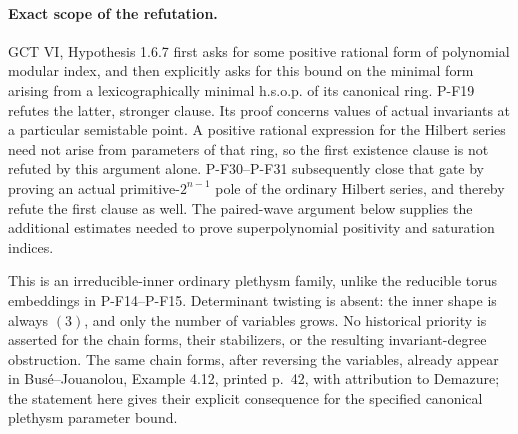 \paragraph{Exact scope of the refutation.}
GCT VI, Hypothesis 1.6.7 first asks for some positive rational
form of polynomial modular index, and then explicitly asks for
this bound on the minimal form arising from a lexicographically
minimal h.s.o.p. of its canonical ring. P-F19 refutes the latter,
stronger clause. Its proof concerns values of actual invariants
at a particular semistable point. A positive rational expression
for the Hilbert series need not arise from parameters of that
ring, so the first existence clause is not refuted by this
argument alone. P-F30--P-F31 subsequently close that gate by proving
an actual primitive-$2^{n-1}$ pole of the ordinary Hilbert series,
and thereby refute the first clause as well. The paired-wave argument below supplies the additional
estimates needed to prove superpolynomial positivity and saturation indices.

This is an irreducible-inner ordinary plethysm family, unlike
the reducible torus embeddings in P-F14--P-F15. Determinant
twisting is absent: the inner shape is always $(3)$, and only
the number of variables grows. No historical
priority is asserted for the chain forms, their stabilizers,
or the resulting invariant-degree obstruction. The same chain
forms, after reversing the variables, already appear in
Bus\'e--Jouanolou, Example 4.12, printed p.~42, with attribution
to Demazure; the statement here gives their explicit consequence
for the specified canonical plethysm parameter bound.
